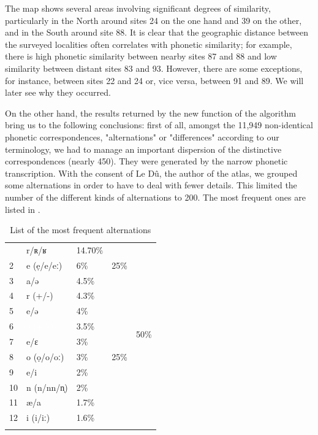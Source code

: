 \documentclass[output=paper]{LSP/langsci}
\begin{document}
The map shows several areas involving significant degrees of similarity, particularly in the North around sites 24 on the one hand and 39 on the other, and in the South around site 88. It is clear that the geographic distance between the surveyed localities often correlates with phonetic similarity; for example, there is high phonetic similarity between nearby sites 87 and 88 and low similarity between distant sites 83 and 93. However, there are some exceptions, for instance, between sites 22 and 24 or, vice versa, between 91 and 89. We will later see why they occurred.

On the other hand, the results returned by the new function of the algorithm bring us to the following conclusions: first of all, amongst the 11,949 non-identical phonetic correspondences, "alternations" or "differences" according to our terminology, we had to manage an important dispersion of the distinctive correspondences (nearly 450). They were generated by the narrow phonetic transcription. With the consent of Le Dû, the author of the atlas, we grouped some alternations in order to have to deal with fewer details. This limited the number of the different kinds of alternations to 200. The most frequent ones are listed in .

\begin{table}
\begin{tabular}{lllll}
\lsptoprule
 1 & {r/ʀ/ʁ} & 14.70\% & \multirow{3}{*}{25\%} & \multirow{12}{*}{50\%}\\
 2 & \cellcolor{gray!50}e (ẹ/e/eː) & 6\% &  & \\
 3 & a/ə & 4.5\% &  & \\
 \hhline{~~~-~}
 4 & r (+/-) & 4.3\% & \multirow{9}{*}{25\%} & \\
 5 & \cellcolor{gray!25}e/ə & 4\% &  & \\
 6 & \cellcolor{black!100}\textcolor{white}{ə (+/-)} & 3.5\% &  & \\
 7 & e/ɛ & 3\% &  & \\
 8 & o (ọ/o/oː) & 3\% &  & \\
 9 & e/i & 2\% &  & \\
 10 & n (n/nn/n̩) & 2\% &  & \\
 11 & æ/a & 1.7\% &  & \\
 12 & i (i/iː) & 1.6\% &  & \\
\lspbottomrule
\end{tabular}
\caption{List of the most frequent alternations}
\label{tab:brun:4}
\end{table}
\end{document}
